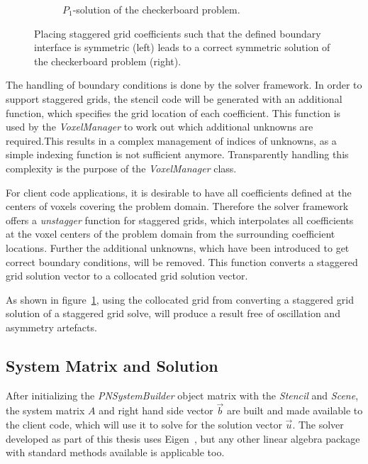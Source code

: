 \begin{figure}[h]
\begin{subfigure}[t]{0.34\columnwidth}
\caption{$P_1$-solution of the checkerboard problem.}
\label{fig:pn_staggering_correct_bc_checkerboard}
\end{subfigure}%
\caption{Placing staggered grid coefficients such that the defined boundary interface is symmetric (left) leads to a correct symmetric solution of the checkerboard problem (right).}
\label{fig:pn_staggered_grid_handled_bc}
\end{figure}

The handling of boundary conditions is done by the solver framework. In order to support staggered grids, the stencil code will be generated with an additional function, which specifies the grid location of each coefficient. This function is used by the \emph{VoxelManager} to work out which additional unknowns are required.This results in a complex management of indices of unknowns, as a simple indexing function is not sufficient anymore. Transparently handling this complexity is the purpose of the \emph{VoxelManager} class.

For client code applications, it is desirable to have all coefficients defined at the centers of voxels covering the problem domain. Therefore the solver framework offers a \emph{unstagger} function for staggered grids, which interpolates all coefficients at the voxel centers of the problem domain from the surrounding coefficient locations. Further the additional unknowns, which have been introduced to get correct boundary conditions, will be removed. This function converts a staggered grid solution vector to a collocated grid solution vector.

As shown in figure~\ref{fig:pn_staggering_correct_bc_checkerboard}, using the collocated grid from converting a staggered grid solution of a staggered grid solve, will produce a result free of oscillation and asymmetry artefacts.

\subsection{System Matrix and Solution}
\label{sec:pn_system_matrix}

After initializing the \emph{PNSystemBuilder} object matrix with the \emph{Stencil} and \emph{Scene}, the system matrix $A$ and right hand side vector $\vec{b}$ are built and made available to the client code, which will use it to solve for the solution vector $\vec{u}$. The solver developed as part of this thesis uses Eigen~\cite{Eigen}, but any other linear algebra package with standard methods available is applicable too. 

